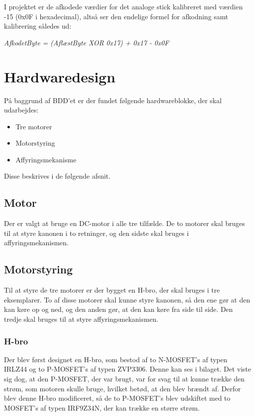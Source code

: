 I projektet er de afkodede værdier for det analoge stick kalibreret med værdien -15 (0x0F i hexadecimal), altså ser den endelige formel for afkodning samt kalibrering således ud:

\textit{AfkodetByte = (AflæstByte XOR 0x17) + 0x17 - 0x0F}

\section{Hardwaredesign}
På baggrund af BDD'et er der fundet følgende hardwareblokke, der skal udarbejdes: 

\begin{itemize}
	\item Tre motorer
	\item Motorstyring
	\item Affyringsmekanisme 
\end{itemize}

Disse beskrives i de følgende afsnit. 

\subsection{Motor}
Der er valgt at bruge en DC-motor i alle tre tilfælde. De to motorer skal bruges til at styre kanonen i to retninger, og den sidste skal bruges i affyringsmekanismen. 

\subsection{Motorstyring}
Til at styre de tre motorer er der bygget en H-bro, der skal bruges i tre eksemplarer. To af disse motorer skal kunne styre kanonen, så den ene gør at den kan køre op og ned, og den anden gør, at den kan køre fra side til side. Den tredje skal bruges til at styre affyringsmekanismen. 

\subsubsection{H-bro}
Der blev først designet en H-bro, som bestod af to N-MOSFET's af typen IRLZ44 og to P-MOSFET's af typen ZVP3306. Denne kan ses i bilaget. Det viste sig dog, at den P-MOSFET, der var brugt, var for svag til at kunne trække den strøm, som motoren skulle bruge, hvilket betød, at den blev brændt af. Derfor blev denne H-bro modificeret, så de to P-MOSFET's blev udskiftet med to MOSFET's af typen IRF9Z34N, der kan trække en større strøm. 

